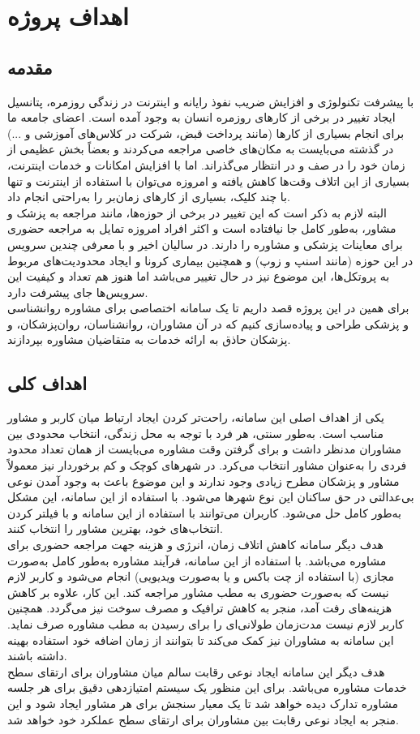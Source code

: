 \section{اهداف پروژه}

\subsection{مقدمه}
با پیشرفت تکنولوژی و افزایش ضریب نفوذ رایانه و اینترنت در زندگی روزمره، پتانسیل ایجاد تغییر در برخی از کارهای روزمره انسان به وجود آمده است. اعضای جامعه ما برای انجام بسیاری از کارها (مانند پرداخت قبض، شرکت در کلاس‌های آموزشی و ...) در گذشته می‌بایست به مکان‌های خاصی مراجعه می‌کردند و بعضاً بخش عظیمی از زمان خود را در صف و در انتظار می‌گذراند. اما با افزایش امکانات و خدمات اینترنت، بسیاری از این اتلاف وقت‌ها کاهش یافته و امروزه می‌توان با استفاده از اینترنت و تنها با چند کلیک، بسیاری از کارهای زمان‌بر را به‌راحتی انجام داد. \\
البته لازم به ذکر است که این تغییر در برخی از حوزه‌ها، مانند مراجعه به پزشک و مشاور، به‌طور کامل جا نیافتاده است و اکثر افراد امروزه تمایل به مراجعه حضوری برای معاینات پزشکی و مشاوره را دارند. در سالیان اخیر و با معرفی چندین سرویس در این حوزه (مانند اسنپ و زوپ) و همچنین بیماری کرونا و ایجاد محدودیت‌های مربوط به پروتکل‌ها، این موضوع نیز در حال تغییر می‌باشد اما هنوز هم تعداد و کیفیت این سرویس‌ها جای پیشرفت دارد. \\
برای همین در این پروژه قصد داریم تا یک سامانه اختصاصی برای مشاوره روانشناسی و پزشکی طراحی و پیاده‌سازی کنیم که در آن مشاوران، روانشناسان، روان‌پزشکان، و پزشکان حاذق به ارائه خدمات به متقاضیان مشاوره بپردازند. 

\subsection{اهداف کلی}
یکی از اهداف اصلی این سامانه، راحت‌تر کردن ایجاد ارتباط میان کاربر و مشاور مناسب است. به‌طور سنتی، هر فرد با توجه به محل زندگی، انتخاب محدودی بین مشاوران مدنظر داشت و برای گرفتن وقت مشاوره می‌بایست از همان تعداد محدود فردی را به‌عنوان مشاور انتخاب می‌کرد. در شهرهای کوچک و کم برخوردار نیز معمولاً مشاور و پزشکان مطرح زیادی وجود ندارند و این موضوع باعث به وجود آمدن نوعی بی‌عدالتی در حق ساکنان این نوع شهرها می‌شود. با استفاده از این سامانه، این مشکل به‌طور کامل حل می‌شود. کاربران می‌توانند با استفاده از این سامانه و با فیلتر کردن انتخاب‌های خود، بهترین مشاور را انتخاب کنند. \\
هدف دیگر سامانه کاهش اتلاف زمان، انرژی و هزینه جهت مراجعه حضوری برای مشاوره می‌باشد. با استفاده از این سامانه، فرآیند مشاوره به‌طور کامل به‌صورت مجازی (با استفاده از چت باکس و یا به‌صورت ویدیویی) انجام می‌شود و کاربر لازم نیست که به‌صورت حضوری به مطب مشاور مراجعه کند. این کار، علاوه بر کاهش هزینه‌های رفت آمد، منجر به کاهش ترافیک و مصرف سوخت نیز می‌گردد. همچنین کاربر لازم نیست مدت‌زمان طولانی‌ای را برای رسیدن به مطب مشاوره صرف نماید. این سامانه به مشاوران نیز کمک می‌کند تا بتوانند از زمان اضافه خود استفاده بهینه داشته باشند. \\
هدف دیگر این سامانه ایجاد نوعی رقابت سالم میان مشاوران برای ارتقای سطح خدمات مشاوره می‌باشد. برای این منظور یک سیستم امتیازدهی دقیق برای هر جلسه مشاوره تدارک دیده خواهد شد تا یک معیار سنجش برای هر مشاور ایجاد شود و این منجر به ایجاد نوعی رقابت بین مشاوران برای ارتقای سطح عملکرد خود خواهد شد. 

